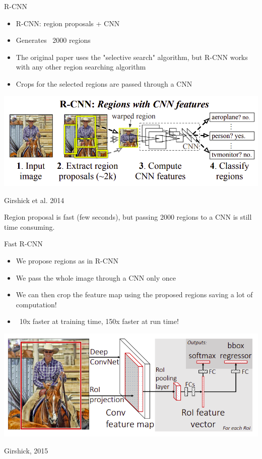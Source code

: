 \documentclass[9pt, aspectratio=169]{beamer}
\begin{document}
\begin{frame}
    {R-CNN}
    \begin{itemize}
        \item R-CNN: region proposals + CNN
        \item Generates ~2000 regions
        \item The original paper uses the "selective search" algorithm, but R-CNN works with any other region searching algorithm
        \item Crops for the selected regions are passed through a CNN
    \end{itemize}
    \centering
    \includegraphics[width=.8\textwidth]{Girshick_2014_RCNN.png}

    \raggedright
    \footnotesize
    Girshick et al. 2014

    \normalsize
    Region proposal is fast (few seconds), but passing 2000 regions to a CNN is still time consuming.
\end{frame}

\begin{frame}
    {Fast R-CNN}
    \begin{itemize}
        \item We propose regions as in R-CNN
        \item We pass the whole image through a CNN only once
        \item We can then crop the feature map using the proposed regions saving a lot of computation!
        \item ~10x faster at training time, 150x faster at run time!
    \end{itemize}
    \centering
    \includegraphics[width=\textwidth]{Girshick_2015_FastRCNN.png}

    \footnotesize
    Girshick, 2015
\end{frame}
\end{document}
